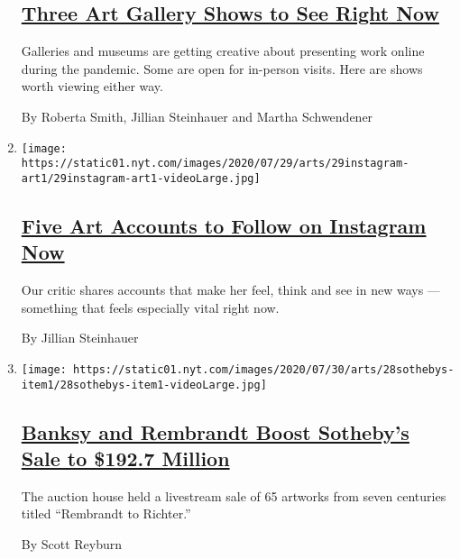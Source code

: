 \begin{enumerate}
{  \subsection{\texorpdfstring{\href{/2020/07/30/arts/design/virtual-art-gallery-shows.html}{Three
  Art Gallery Shows to See Right
  Now}}{Three Art Gallery Shows to See Right Now}}\label{three-art-gallery-shows-to-see-right-now}}

  Galleries and museums are getting creative about presenting work
  online during the pandemic. Some are open for in-person visits. Here
  are shows worth viewing either way.

  By Roberta Smith, Jillian Steinhauer and Martha Schwendener
\item
  \texttt{[image: https://static01.nyt.com/images/2020/07/29/arts/29instagram-art1/29instagram-art1-videoLarge.jpg]}

  \hypertarget{five-art-accounts-to-follow-on-instagram-now}{%
  \subsection{\texorpdfstring{\href{/2020/07/29/arts/design/art-accounts-to-follow-instagram.html}{Five
  Art Accounts to Follow on Instagram
  Now}}{Five Art Accounts to Follow on Instagram Now}}\label{five-art-accounts-to-follow-on-instagram-now}}

  Our critic shares accounts that make her feel, think and see in new
  ways --- something that feels especially vital right now.

  By Jillian Steinhauer
\item
  \texttt{[image: https://static01.nyt.com/images/2020/07/30/arts/28sothebys-item1/28sothebys-item1-videoLarge.jpg]}

  \hypertarget{banksy-and-rembrandt-boost-sothebys-sale-to-1927-million}{%
  \subsection{\texorpdfstring{\href{/2020/07/28/arts/design/sothebys-banksy-rembrandt.html}{Banksy
  and Rembrandt Boost Sotheby's Sale to \$192.7
  Million}}{Banksy and Rembrandt Boost Sotheby's Sale to \$192.7 Million}}\label{banksy-and-rembrandt-boost-sothebys-sale-to-1927-million}}

  The auction house held a livestream sale of 65 artworks from seven
  centuries titled ``Rembrandt to Richter.''

  By Scott Reyburn
\end{enumerate}

